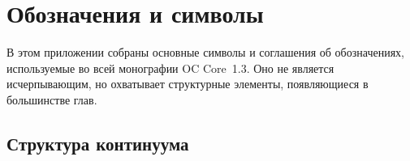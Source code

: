 \section{Обозначения и символы}
\label{app:notation}

В этом приложении собраны основные символы и соглашения об обозначениях, используемые
во всей монографии OC Core~1.3. Оно не является исчерпывающим, но охватывает
структурные элементы, появляющиеся в большинстве глав.

\subsection{Структура континуума}


